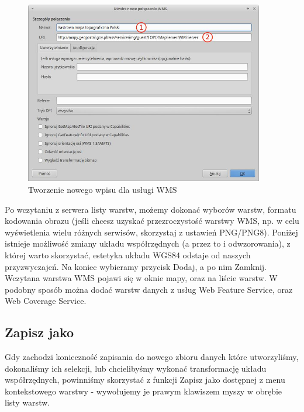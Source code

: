 \documentclass[12pt,a4paper]{book}
\begin{document}
\begin{figure}[!ht]
	\centering
	\includegraphics[height=8cm]{002-tworzenie-wms.jpg}
	\caption{Tworzenie nowego wpisu dla usługi WMS}
\end{figure}

Po wczytaniu z serwera listy warstw, możemy dokonać wyborów warstw, formatu kodowania obrazu (jeśli chcesz uzyskać przezroczystość warstwy WMS, np. w celu wyświetlenia wielu różnych serwisów, skorzystaj z ustawień PNG/PNG8). Poniżej istnieje możliwość zmiany układu współrzędnych (a przez to i odwzorowania), z której warto skorzystać, estetyka układu WGS84 odstaje od naszych przyzwyczajeń. Na koniec wybieramy przycisk Dodaj, a po nim Zamknij. Wczytana warstwa WMS pojawi się w oknie mapy, oraz na liście warstw.
W podobny sposób można dodać warstw danych z usług Web Feature Service, oraz Web Coverage Service.

\subsection{Zapisz jako}
Gdy zachodzi konieczność zapisania do nowego zbioru danych które utworzyliśmy, dokonaliśmy ich selekcji, lub chcielibyśmy wykonać transformację układu współrzędnych, powinniśmy skorzystać z funkcji Zapisz jako dostępnej z menu kontekstowego warstwy - wywołujemy je prawym klawiszem myszy w obrębie listy warstw.
\end{document}

